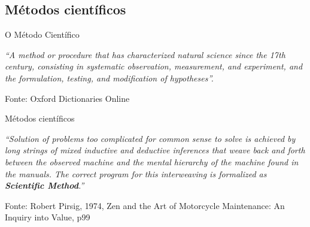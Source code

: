 \documentclass{beamer}
\begin{document}
\subsection{Métodos científicos}


\begin{frame}{O Método Científico}
  \begin{block}{}
    \footnotesize
    {\em ``A method or procedure that has characterized natural science since the 17th century, consisting in systematic observation, measurement, and experiment, and the formulation, testing, and modification of hypotheses''.}
  \end{block}

  \vfill
  \tiny
  \hfill Fonte: Oxford Dictionaries Online
\end{frame}

\begin{frame}{Métodos científicos}
  \begin{block}{}
    \footnotesize
    {\em ``Solution of problems too complicated for common sense to solve
    is achieved by long strings of mixed \alert{inductive} and
    \alert{deductive} inferences that weave back and forth between the
    observed machine and the mental hierarchy of the machine found in
    the manuals. The correct program for this interweaving is
    formalized as {\bf Scientific Method}.''}
  \end{block}

  \vfill
  \tiny
  \hfill Fonte: Robert Pirsig, 1974, Zen and the Art of Motorcycle
  Maintenance: An Inquiry into Value, p99
\end{frame}

\end{document}
